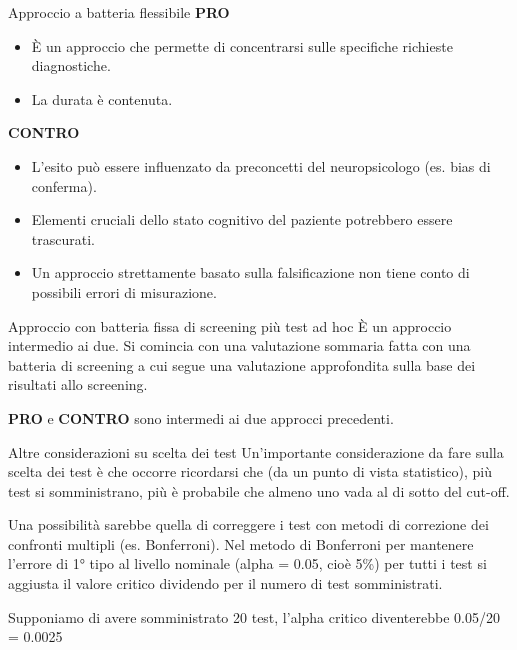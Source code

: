 \documentclass[
  ignorenonframetext,
  aspectratio=169,
]{beamer}
\providecommand{\tightlist}{%
  \setlength{\itemsep}{0pt}\setlength{\parskip}{0pt}}
\begin{document}
\begin{frame}{Approccio a batteria flessibile}
\label{approccio-a-batteria-flessibile-2}
\textbf{PRO}

\begin{itemize}
\tightlist
\item
  È un approccio che permette di concentrarsi sulle specifiche richieste
  diagnostiche.
\item
  La durata è contenuta.
\end{itemize}

\textbf{CONTRO}

\begin{itemize}
\tightlist
\item
  L'esito può essere influenzato da preconcetti del neuropsicologo (es.
  bias di conferma).
\item
  Elementi cruciali dello stato cognitivo del paziente potrebbero essere
  trascurati.
\item
  Un approccio strettamente basato sulla falsificazione non tiene conto
  di possibili errori di misurazione.
\end{itemize}
\end{frame}

\begin{frame}{Approccio con batteria fissa di screening più test ad hoc}
\label{approccio-con-batteria-fissa-di-screening-piuxf9-test-ad-hoc}
È un approccio intermedio ai due. Si comincia con una valutazione
sommaria fatta con una batteria di screening a cui segue una valutazione
approfondita sulla base dei risultati allo screening.

\textbf{PRO} e \textbf{CONTRO} sono intermedi ai due approcci
precedenti.
\end{frame}

\begin{frame}{Altre considerazioni su scelta dei test}
\label{altre-considerazioni-su-scelta-dei-test}
Un'importante considerazione da fare sulla scelta dei test è che occorre
ricordarsi che (da un punto di vista statistico), più test si
somministrano, più è probabile che almeno uno vada al di sotto del
cut-off.

Una possibilità sarebbe quella di correggere i test con metodi di
correzione dei confronti multipli (es. Bonferroni). Nel metodo di
Bonferroni per mantenere l'errore di 1° tipo al livello nominale (alpha
= 0.05, cioè 5\%) per tutti i test si aggiusta il valore critico
dividendo per il numero di test somministrati.

Supponiamo di avere somministrato 20 test, l'alpha critico diventerebbe
0.05/20 = 0.0025
\end{frame}
\end{document}
